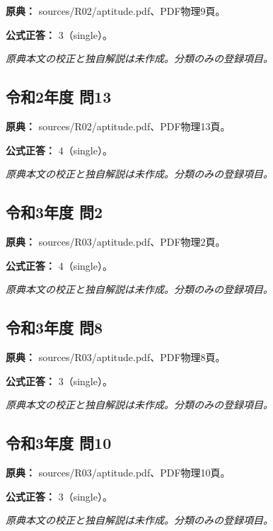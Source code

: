 \noindent\textbf{原典：} sources/R02/aptitude.pdf、PDF物理9頁。

\textbf{公式正答：} 3（single）。

\par\textit{原典本文の校正と独自解説は未作成。分類のみの登録項目。}

\subsection{令和2年度 問13}
\label{q:r02-reg-apt-13}

\noindent\textbf{原典：} sources/R02/aptitude.pdf、PDF物理13頁。

\textbf{公式正答：} 4（single）。

\par\textit{原典本文の校正と独自解説は未作成。分類のみの登録項目。}

\subsection{令和3年度 問2}
\label{q:r03-reg-apt-02}

\noindent\textbf{原典：} sources/R03/aptitude.pdf、PDF物理2頁。

\textbf{公式正答：} 4（single）。

\par\textit{原典本文の校正と独自解説は未作成。分類のみの登録項目。}

\subsection{令和3年度 問8}
\label{q:r03-reg-apt-08}

\noindent\textbf{原典：} sources/R03/aptitude.pdf、PDF物理8頁。

\textbf{公式正答：} 3（single）。

\par\textit{原典本文の校正と独自解説は未作成。分類のみの登録項目。}

\subsection{令和3年度 問10}
\label{q:r03-reg-apt-10}

\noindent\textbf{原典：} sources/R03/aptitude.pdf、PDF物理10頁。

\textbf{公式正答：} 3（single）。

\par\textit{原典本文の校正と独自解説は未作成。分類のみの登録項目。}

